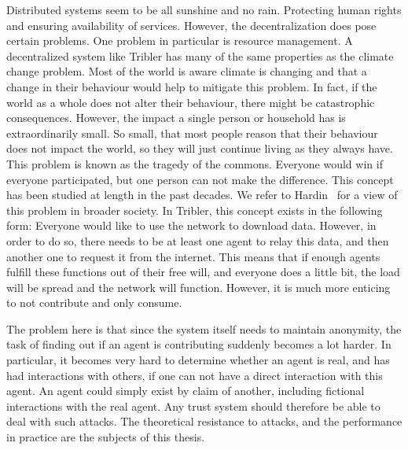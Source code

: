 \documentclass[a4paper,11pt]{book}
\theoremstyle{definition}
\begin{document}
Distributed systems seem to be all sunshine and no rain. Protecting human rights 
and ensuring availability of services. However, the decentralization does pose certain 
problems. One problem in particular is resource management. A decentralized system
like Tribler has many of the same properties as the climate change problem. Most of the
world is aware climate is changing and that a change in their behaviour would help to
mitigate this problem. In fact, if the world as a whole does not alter their behaviour,
there might be catastrophic consequences. However, the impact a single person or household
has is extraordinarily small. So small, that most people reason that their behaviour
does not impact the world, so they will just continue living as they always have. 
This problem is known as the tragedy of the commons. Everyone would win if everyone
participated, but one person can not make the difference. 
This concept has been studied at length in the past decades. We refer to
Hardin~\cite{hardin2009tragedy} for a view of this problem in broader society.
In Tribler, this concept exists in the following form: Everyone would like to use 
the network to download data. However, in order to do so, there needs to be at least
one agent to relay this data, and then another one to request it from the internet.
This means that if enough agents fulfill these functions out of their free will,
and everyone does a little bit, the load will be spread and the network will
function. However, it is much more enticing to not contribute and only consume.

\addtocounter{footnote}{-1}
\addtocounter{footnote}{1}


The problem here is that since the system itself needs to maintain anonymity, the task of
finding out if an agent is contributing suddenly becomes a lot harder. In particular, 
it becomes very hard to determine whether an agent is real, and has had interactions with
others, if one can not have a direct interaction with this agent. An agent could simply
exist by claim of another, including fictional interactions with the real agent. Any trust system
should therefore be able to deal with such attacks. The theoretical resistance to attacks,
and the performance in practice are the subjects of this thesis.
\end{document}
